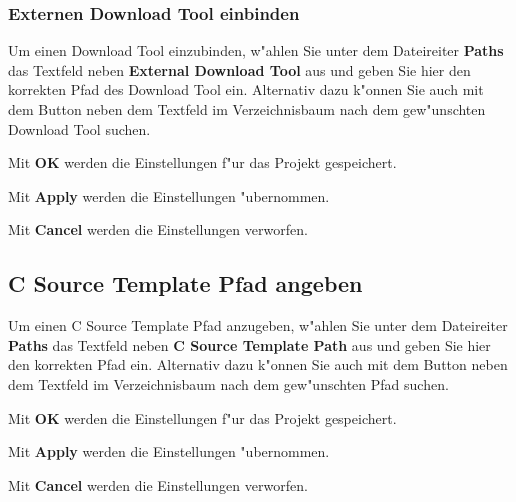 \documentclass[a4paper,titlepage,12pt,ngerman]{scrbook}
\begin{document}
\subsubsection{Externen Download Tool einbinden}
Um einen Download Tool einzubinden, w"ahlen Sie unter dem Dateireiter {\bf Paths} das Textfeld neben {\bf External Download Tool} aus und geben Sie hier den korrekten Pfad des Download Tool ein. Alternativ dazu k"onnen Sie auch mit dem Button neben dem Textfeld im Verzeichnisbaum nach dem gew"unschten Download Tool suchen. \par
Mit {\bf OK} werden die Einstellungen f"ur das Projekt gespeichert.\par
Mit {\bf Apply} werden die Einstellungen "ubernommen.\par
Mit {\bf Cancel} werden die Einstellungen verworfen.\par 

\subsection{C Source Template Pfad angeben}
Um einen C Source Template Pfad anzugeben, w"ahlen Sie unter dem Dateireiter {\bf Paths} das Textfeld neben {\bf C Source Template Path} aus und geben Sie hier den korrekten Pfad ein. Alternativ dazu k"onnen Sie auch mit dem Button neben dem Textfeld im Verzeichnisbaum nach dem gew"unschten Pfad suchen. \par
Mit {\bf OK} werden die Einstellungen f"ur das Projekt gespeichert.\par
Mit {\bf Apply} werden die Einstellungen "ubernommen.\par
Mit {\bf Cancel} werden die Einstellungen verworfen.\par 
\end{document}
